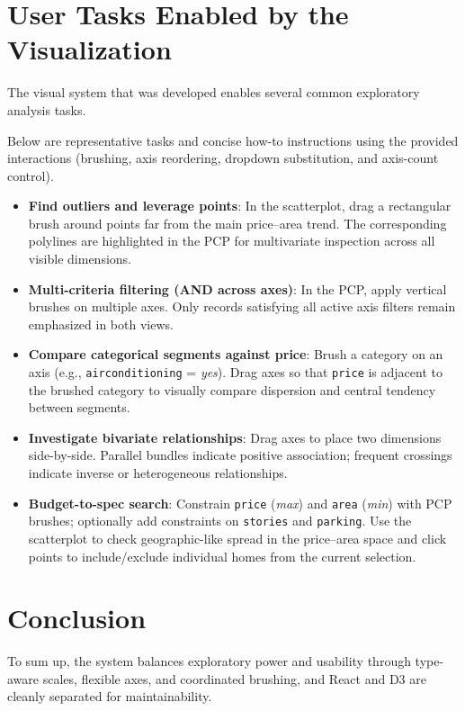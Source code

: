 \documentclass[10pt,a4paper]{article}
\begin{document}
\section{User Tasks Enabled by the Visualization}

The visual system that was developed enables several common exploratory analysis tasks.

Below are representative tasks and concise how-to instructions using the provided interactions (brushing, axis reordering, dropdown substitution, and axis-count control).

\begin{itemize}[leftmargin=*, itemsep=2pt]
    \item \textbf{Find outliers and leverage points}: In the scatterplot, drag a rectangular brush around points far from the main price–area trend. The corresponding polylines are highlighted in the PCP for multivariate inspection across all visible dimensions.
    \item \textbf{Multi-criteria filtering (AND across axes)}: In the PCP, apply vertical brushes on multiple axes. Only records satisfying all active axis filters remain emphasized in both views.
    \item \textbf{Compare categorical segments against price}: Brush a category on an axis (e.g., \texttt{airconditioning} = \textit{yes}). Drag axes so that \texttt{price} is adjacent to the brushed category to visually compare dispersion and central tendency between segments.
    \item \textbf{Investigate bivariate relationships}: Drag axes to place two dimensions side-by-side. Parallel bundles indicate positive association; frequent crossings indicate inverse or heterogeneous relationships.
    \item \textbf{Budget-to-spec search}: Constrain \texttt{price} (\textit{max}) and \texttt{area} (\textit{min}) with PCP brushes; optionally add constraints on \texttt{stories} and \texttt{parking}. Use the scatterplot to check geographic-like spread in the price–area space and click points to include/exclude individual homes from the current selection.
\end{itemize}

\section{Conclusion}

To sum up, the system balances exploratory power and usability through type-aware scales, flexible axes, and coordinated brushing, and React and D3 are cleanly separated for maintainability.
\end{document}
